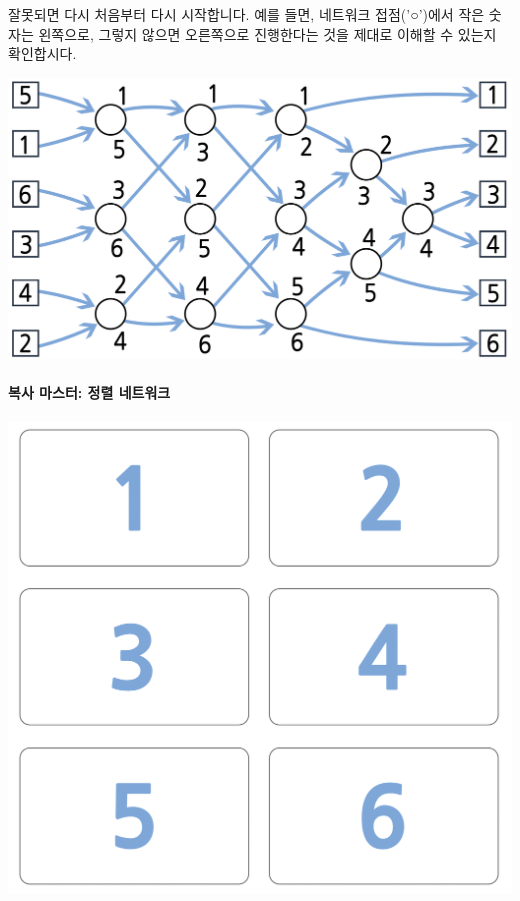 \documentclass[]{article}
\begin{document}
잘못되면 다시 처음부터 다시 시작합니다. 예를 들면, 네트워크
접점('○')에서 작은 숫자는 왼쪽으로, 그렇지 않으면 오른쪽으로 진행한다는
것을 제대로 이해할 수 있는지 확인합시다.

\includegraphics{csunplugged/02-part/img/ch08-parallel/08-parallel-01-activity-solution.png}

\mbox{}\paragraph{복사 마스터: 정렬 네트워크}\label{section-118}

\includegraphics{csunplugged/02-part/img/ch08-parallel/08-parallel-02-photocopy-master-01.png}
\end{document}
